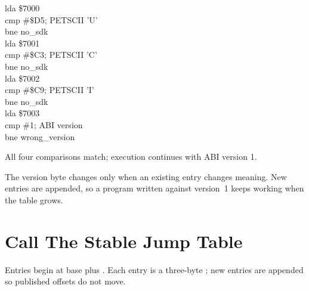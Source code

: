 \begin{listingbox}
\hspace*{2em}lda \$7000\\
\hspace*{2em}cmp \#\$D5\hspace{2em}; PETSCII 'U'\\
\hspace*{2em}bne no\_sdk\\
\hspace*{2em}lda \$7001\\
\hspace*{2em}cmp \#\$C3\hspace{2em}; PETSCII 'C'\\
\hspace*{2em}bne no\_sdk\\
\hspace*{2em}lda \$7002\\
\hspace*{2em}cmp \#\$C9\hspace{2em}; PETSCII 'I'\\
\hspace*{2em}bne no\_sdk\\
\hspace*{2em}lda \$7003\\
\hspace*{2em}cmp \#1\hspace{3em}; ABI version\\
\hspace*{2em}bne wrong\_version
\end{listingbox}

\begin{resultbox}
All four comparisons match; execution continues with ABI version 1.
\end{resultbox}

The version byte changes only when an existing entry changes meaning. New
entries are appended, so a program written against version~1 keeps working
when the table grows.


\section{Call The Stable Jump Table}

Entries begin at base plus . Each entry is a three-byte ;
new entries are appended so published offsets do not move.

